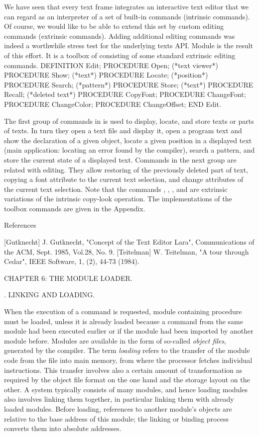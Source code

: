 We have seen that every text frame integrates an interactive text editor that we can regard as an interpreter of a set of built-in commands (intrinsic commands). Of course, we would like to be able to extend this set by custom editing commands (extrinsic commands). Adding additional editing commands was indeed a worthwhile stress test for the underlying texts API. Module  is the result of this effort. It is a toolbox of consisting of some standard extrinsic editing commands.
\begintt
DEFINITION Edit;
PROCEDURE Open; (*text viewer*) PROCEDURE Show; (*text*) PROCEDURE Locate; (*position*) PROCEDURE Search; (*pattern*) PROCEDURE Store; (*text*)
PROCEDURE Recall; (*deleted text*) PROCEDURE CopyFont; PROCEDURE ChangeFont; PROCEDURE ChangeColor; PROCEDURE ChangeOffset;
END Edit.
\endtt

\noindent The first group of commands in  is used to display, locate, and store texts or parts of texts. In turn they open a text file and display it, open a program text and show the declaration of a given object, locate a given position in a displayed text (main application: locating an error found by the compiler), search a pattern, and store the current state of a displayed text. Commands in the next group are related with editing. They allow restoring of the previously deleted part of text, copying a font attribute to the current text selection, and change attributes of the current text selection. Note that the commands , , , and  are extrinsic variations of the intrinsic copy-look operation. The implementations of the toolbox commands are given in the Appendix.

References

[Gutknecht] J. Gutknecht, "Concept of the Text Editor Lara", Communications of the ACM, Sept. 1985, Vol.28, No. 9.
[Teitelman] W. Teitelman, "A tour through Cedar", IEEE Software, 1, (2), 44-73 (1984).

\beginchapter CHAPTER 6: THE MODULE LOADER.

. LINKING AND LOADING.

When the execution of a command  is requested, module  containing procedure  must be loaded, unless it is already loaded because a command from the same module had been executed earlier or if the module had been imported by another module before. Modules are available in the form of so-called \emph{object files}, generated by the compiler. The term \emph{loading} refers to the transfer of the module code from the file into main memory, from where the processor fetches individual instructions. This transfer involves also a certain amount of transformation as required by the object file format on the one hand and the storage layout on the other. A system typically consists of many modules, and hence loading modules also involves linking them together, in particular linking them with already loaded modules. Before loading, references to another module's objects are relative to the base address of this module; the linking or binding process converts them into absolute addresses.

